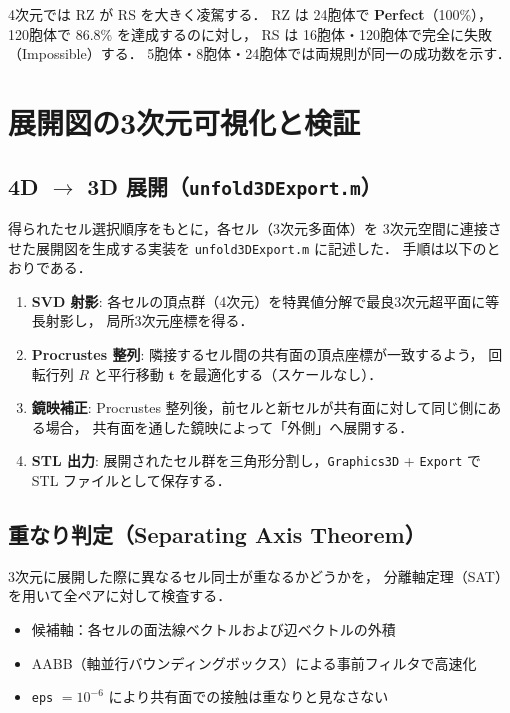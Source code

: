 \documentclass[12pt,a4paper]{article}
\theoremstyle{definition}
\begin{document}
\noindent
4次元では RZ が RS を大きく凌駕する．
RZ は 24胞体で \textbf{Perfect}（100\%），120胞体で 86.8\% を達成するのに対し，
RS は 16胞体・120胞体で完全に失敗（Impossible）する．
5胞体・8胞体・24胞体では両規則が同一の成功数を示す．

\section{展開図の3次元可視化と検証}

\subsection{4D $\to$ 3D 展開（\texttt{unfold3DExport.m}）}

得られたセル選択順序をもとに，各セル（3次元多面体）を
3次元空間に連接させた展開図を生成する実装を \texttt{unfold3DExport.m} に記述した．
手順は以下のとおりである．

\begin{enumerate}[label=\textbf{Step \arabic*.}]
  \item \textbf{SVD 射影}:
        各セルの頂点群（4次元）を特異値分解で最良3次元超平面に等長射影し，
        局所3次元座標を得る．

  \item \textbf{Procrustes 整列}:
        隣接するセル間の共有面の頂点座標が一致するよう，
        回転行列 $R$ と平行移動 $\boldsymbol{t}$ を最適化する（スケールなし）．

  \item \textbf{鏡映補正}:
        Procrustes 整列後，前セルと新セルが共有面に対して同じ側にある場合，
        共有面を通した鏡映によって「外側」へ展開する．

  \item \textbf{STL 出力}:
        展開されたセル群を三角形分割し，\texttt{Graphics3D} + \texttt{Export} で
        STL ファイルとして保存する．
\end{enumerate}

\subsection{重なり判定（Separating Axis Theorem）}

3次元に展開した際に異なるセル同士が重なるかどうかを，
分離軸定理（SAT）を用いて全ペアに対して検査する．

\begin{itemize}
  \item 候補軸：各セルの面法線ベクトルおよび辺ベクトルの外積
  \item AABB（軸並行バウンディングボックス）による事前フィルタで高速化
  \item \texttt{eps} $= 10^{-6}$ により共有面での接触は重なりと見なさない
\end{itemize}
\end{document}
